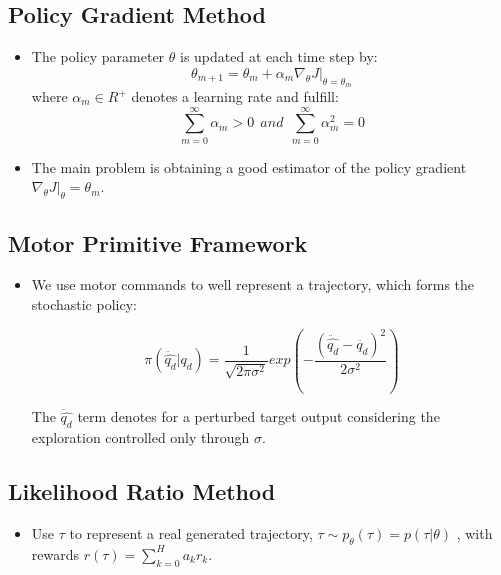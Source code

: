 {\begin{pcolumn}
\subsection{Policy Gradient Method}
\vspace*{-17mm}
%
{\large
\begin{itemize}
	\item The policy parameter $\theta$ is updated at each time step by:
\begin{equation}
	\theta_{m+1} = \theta_m + \alpha_m \nabla_\theta J |_{\theta = \theta_m}
\end{equation}
where $\alpha_m \in R^+$ denotes a learning rate and fulfill:
\begin{equation}
	\sum_{m=0}^\infty  \alpha_m > 0  \ \ and \  \ \sum_{m=0}^\infty \alpha_m^2 = 0
\end{equation}
	\item The main problem is obtaining a good estimator of the policy gradient $\nabla_\theta J |_\theta=\theta_m$.
\end{itemize}
}
\subsection{Motor Primitive Framework}
\vspace*{-17mm}
%
{\large
\begin{itemize}
	\item We use motor commands to well represent a trajectory, which forms the stochastic policy:

\begin{equation}
	\pi(\ddot{\hat{q_d}} | q_d) = \frac{1}{\sqrt{2 \pi \sigma^2}} exp(-\frac{(\ddot{\hat{q_d}} - \ddot{q_d})^2}{2 \sigma^2})
\end{equation}

The $\ddot{\hat{q_d}}$ term denotes for a perturbed target output considering the exploration controlled only through $\sigma$.
\end{itemize}
}


\subsection{Likelihood Ratio Method}
\vspace*{-17mm}
{\large
%
\begin{itemize}
	\item Use $\tau$ to represent a real generated trajectory, $\tau \sim p_\theta(\tau) = p(\tau | \theta)$ , with rewards $r(\tau) = \sum_{k=0}^H a_k r_k$. 
	

\end{itemize}}
\end{pcolumn}}
